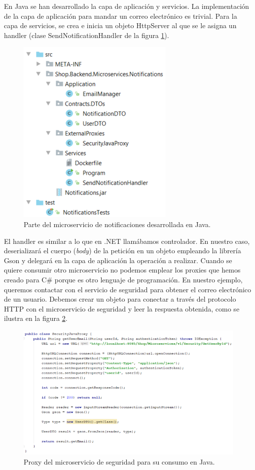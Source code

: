\documentclass[11pt,spanish,listoffigures]{tfgetsinf}
\begin{document}
En Java se han desarrollado la capa de aplicación y servicios. La implementación de la capa de aplicación para mandar un correo electrónico es trivial. Para la capa de servicios, se crea e inicia un objeto HttpServer al que se le asigna un handler (clase SendNotificationHandler de la figura \ref{fig:NotificationsJava}).

\begin{figure}[h]
\centering
\includegraphics[scale=0.85]{NotificationsJava}
\caption{Parte del microservicio de notificaciones desarrollada en Java.}
\label{fig:NotificationsJava}
\end{figure}

El handler es similar a lo que en .NET llamábamos controlador. En nuestro caso, deserializará el cuerpo (\textit{body}) de la petición en un objeto empleando la librería Gson y delegará en la capa de aplicación la operación a realizar. Cuando se quiere consumir otro microservicio no podemos emplear los proxies que hemos creado para C\# porque es otro lenguaje de programación. En nuestro ejemplo, queremos contactar con el servicio de seguridad para obtener el correo electrónico de un usuario. Debemos crear un objeto para conectar a través del protocolo HTTP con el microservicio de seguridad y leer la respuesta obtenida, como se ilustra en la figura \ref{fig:JavaProxy}.

\begin{figure}[h]
\centering
\includegraphics[scale=0.85]{JavaProxy}
\caption{Proxy del microservicio de seguridad para su consumo en Java.}
\label{fig:JavaProxy}
\end{figure}
\end{document}
